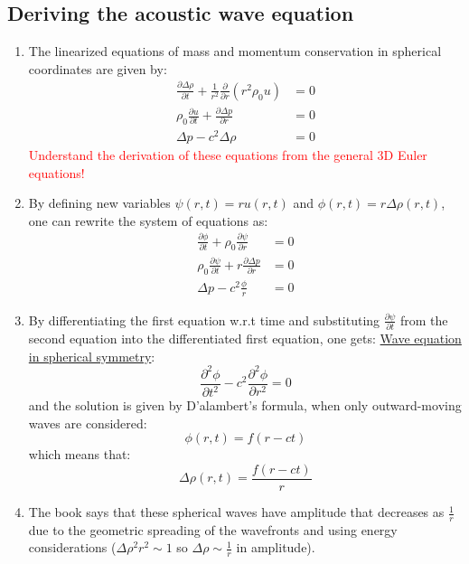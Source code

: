 ﻿\documentclass[11pt]{article}
\begin{document}
\subsection{Deriving the acoustic wave equation}
\begin{enumerate}
    \item The linearized equations of mass and momentum conservation in spherical coordinates are given by:
    \begin{align}
      \frac{\partial \Delta \rho}{\partial t} + \frac{1}{r^2} \frac{\partial}{\partial r} (r^2 \rho_0 u) &= 0 \\
      \rho_0 \frac{\partial u}{\partial t} + \frac{\partial \Delta p}{\partial r} &= 0 \\
      \Delta p - c^2 \Delta \rho &= 0
    \end{align}
    \textcolor{red}{Understand the derivation of these equations from the general 3D Euler equations!}
    \item By defining new variables $\psi(r,t) = r u(r,t)$ and $\phi(r,t) = r \Delta \rho(r,t)$, one can rewrite the system of equations as:
    \begin{align}
      \frac{\partial \phi}{\partial t} + \rho_0 \frac{\partial \psi}{\partial r} &= 0 \\
      \rho_0 \frac{\partial \psi}{\partial t} + r \frac{\partial \Delta p}{\partial r} &= 0 \\
      \Delta p - c^2 \frac{\phi}{r} &= 0
    \end{align}
    \item By differentiating the first equation w.r.t time and substituting $\frac{\partial \psi}{\partial t}$ from the second equation into the differentiated first equation, one gets:
    \underline{Wave equation in spherical symmetry}:
    \begin{equation}
      \frac{\partial^2 \phi}{\partial t^2} - c^2 \frac{\partial^2 \phi}{\partial r^2} = 0
    \end{equation}
    and the solution is given by D'alambert's formula, when only outward-moving waves are considered:
    \begin{equation}
      \phi(r,t) = f(r-ct)
    \end{equation}
    which means that:
    \begin{equation}
      \Delta \rho(r,t) = \frac{f(r-ct)}{r}
    \end{equation}
    \item The book says that these spherical waves have amplitude that decreases as $\frac{1}{r}$ due to the geometric spreading of the wavefronts and using energy considerations ($\Delta\rho^2 r^2 \sim 1$ so $\Delta \rho \sim \frac{1}{r}$ in amplitude).

\end{enumerate}
\end{document}
